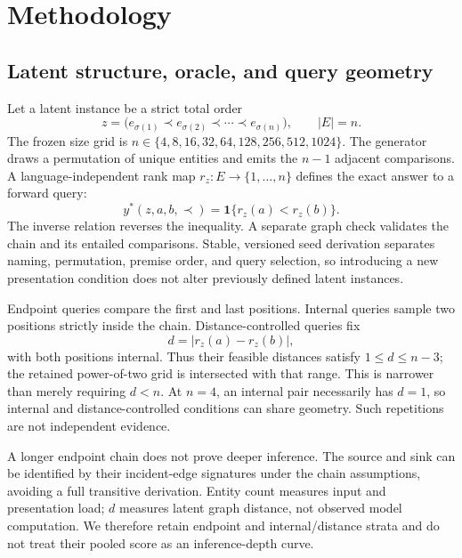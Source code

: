 \section{Methodology}

\subsection{Latent structure, oracle, and query geometry}

Let a latent instance be a strict total order
\begin{equation}
  z = \bigl(e_{\sigma(1)} \prec e_{\sigma(2)} \prec \cdots \prec e_{\sigma(n)}\bigr),
  \qquad |E| = n.
  \label{eq:latent}
\end{equation}
The frozen size grid is $n \in \{4, 8, 16, 32, 64, 128, 256, 512, 1024\}$. The generator draws a
permutation of unique entities and emits the $n-1$ adjacent comparisons. A language-independent rank map
$r_z : E \to \{1, \ldots, n\}$ defines the exact answer to a forward query:
\begin{equation}
  y^{*}(z, a, b, \prec) = \mathbf{1}\{r_z(a) < r_z(b)\}.
  \label{eq:oracle}
\end{equation}
The inverse relation reverses the inequality. A separate graph check validates the chain and its entailed
comparisons. Stable, versioned seed derivation separates naming, permutation, premise order, and query
selection, so introducing a new presentation condition does not alter previously defined latent instances.

Endpoint queries compare the first and last positions. Internal queries sample two positions strictly
inside the chain. Distance-controlled queries fix
\begin{equation}
  d = |r_z(a) - r_z(b)|,
  \label{eq:distance}
\end{equation}
with both positions internal. Thus their feasible distances satisfy $1 \le d \le n-3$; the retained
power-of-two grid is intersected with that range. This is narrower than merely requiring $d < n$. At
$n = 4$, an internal pair necessarily has $d = 1$, so internal and distance-controlled conditions can share
geometry. Such repetitions are not independent evidence.

A longer endpoint chain does not prove deeper inference. The source and sink can be identified by their
incident-edge signatures under the chain assumptions, avoiding a full transitive derivation. Entity count
measures input and presentation load; $d$ measures latent graph distance, not observed model computation.
We therefore retain endpoint and internal/distance strata and do not treat their pooled score as an
inference-depth curve.

